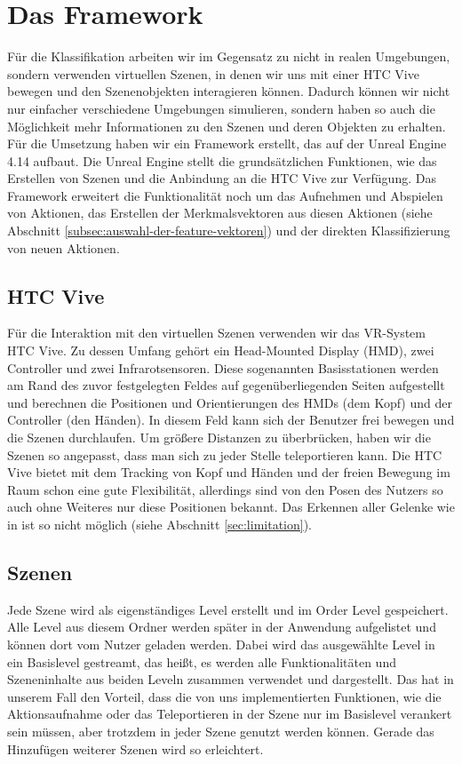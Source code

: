
\section{Das Framework}

Für die Klassifikation arbeiten wir im Gegensatz zu \cite{scene-grok} nicht in realen Umgebungen, sondern verwenden virtuellen Szenen, in denen wir uns mit einer HTC Vive \cite{htc-vive} bewegen und den Szenenobjekten interagieren können. Dadurch können wir nicht nur einfacher verschiedene Umgebungen simulieren, sondern haben so auch die Möglichkeit mehr Informationen zu den Szenen und deren Objekten zu erhalten.
Für die Umsetzung haben wir ein Framework erstellt, das auf der Unreal Engine 4.14 \cite{ue4} aufbaut. Die Unreal Engine stellt die grundsätzlichen Funktionen, wie das Erstellen von Szenen und die Anbindung an die HTC Vive zur Verfügung. Das Framework erweitert die Funktionalität noch um das Aufnehmen und Abspielen von Aktionen, das Erstellen der Merkmalsvektoren aus diesen Aktionen (siehe Abschnitt \ref{subsec:auswahl-der-feature-vektoren}) und der direkten Klassifizierung von neuen Aktionen.

\subsection{HTC Vive}
Für die Interaktion mit den virtuellen Szenen verwenden wir das VR-System HTC Vive. Zu dessen Umfang gehört ein Head-Mounted Display (HMD), zwei Controller und zwei Infrarotsensoren. Diese sogenannten Basisstationen werden am Rand des zuvor festgelegten Feldes auf gegenüberliegenden Seiten aufgestellt und berechnen die Positionen und Orientierungen des HMDs (dem Kopf) und der Controller (den Händen). In diesem Feld kann sich der Benutzer frei bewegen und die Szenen durchlaufen. Um größere Distanzen zu überbrücken, haben wir die Szenen so angepasst, dass man sich zu jeder Stelle teleportieren kann. Die HTC Vive bietet mit dem Tracking von Kopf und Händen und der freien Bewegung im Raum schon eine gute Flexibilität, allerdings sind von den Posen des Nutzers so auch ohne Weiteres nur diese Positionen bekannt. Das Erkennen aller Gelenke wie in \cite{scene-grok} ist so nicht möglich (siehe Abschnitt \ref{sec:limitation}).

\subsection{Szenen}
Jede Szene wird als eigenständiges Level erstellt und im Order \glqq{}Level\grqq{} gespeichert. Alle Level aus diesem Ordner werden später in der Anwendung aufgelistet und können dort vom Nutzer geladen werden. Dabei wird das ausgewählte Level in ein Basislevel \glqq{}gestreamt\grqq{}, das heißt, es werden alle Funktionalitäten und Szeneninhalte aus beiden Leveln zusammen verwendet und dargestellt. Das hat in unserem Fall den Vorteil, dass die von uns implementierten Funktionen, wie die Aktionsaufnahme oder das Teleportieren in der Szene nur im Basislevel verankert sein müssen, aber trotzdem in jeder Szene genutzt werden können. Gerade das Hinzufügen weiterer Szenen wird so erleichtert.

